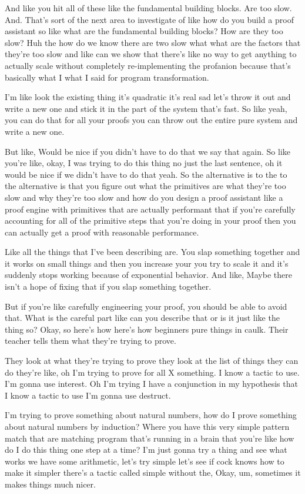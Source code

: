 \begin{subappendices}
And like you hit all of these like the fundamental building blocks. Are too slow. And. That's sort of the next area to investigate of like how do you build a proof assistant so like what are the fundamental building blocks? How are they too slow? Huh the how do we know there are two slow what what are the factors that they're too slow and like can we show that there's like no way to get anything to actually scale without completely re-implementing the profanion because that's basically what I what I said for program transformation.

I'm like look the existing thing it's quadratic it's real sad let's throw it out and write a new one and stick it in the part of the system that's fast. So like yeah, you can do that for all your proofs you can throw out the entire pure system and write a new one.

But like, Would be nice if you didn't have to do that we say that again. So like you're like, okay, I was trying to do this thing no just the last sentence, oh it would be nice if we didn't have to do that yeah. So the alternative is to the to the alternative is that you figure out what the primitives are what they're too slow and why they're too slow and how do you design a proof assistant like a proof engine with primitives that are actually performant that if you're carefully accounting for all of the primitive steps that you're doing in your proof then you can actually get a proof with reasonable performance.

Like all the things that I've been describing are. You slap something together and it works on small things and then you increase your you try to scale it and it's suddenly stops working because of exponential behavior. And like, Maybe there isn't a hope of fixing that if you slap something together.

But if you're like carefully engineering your proof, you should be able to avoid that. What is the careful part like can you describe that or is it just like the thing so? Okay, so here's how here's how beginners pure things in caulk. Their teacher tells them what they're trying to prove.

They look at what they're trying to prove they look at the list of things they can do they're like, oh I'm trying to prove for all X something. I know a tactic to use. I'm gonna use interest. Oh I'm trying I have a conjunction in my hypothesis that I know a tactic to use I'm gonna use destruct.

I'm trying to prove something about natural numbers, how do I prove something about natural numbers by induction? Where you have this very simple pattern match that are matching program that's running in a brain that you're like how do I do this thing one step at a time? I'm just gonna try a thing and see what works we have some arithmetic, let's try simple let's see if cock knows how to make it simpler there's a tactic called simple without the, Okay, um, sometimes it makes things much nicer.


\end{subappendices}
